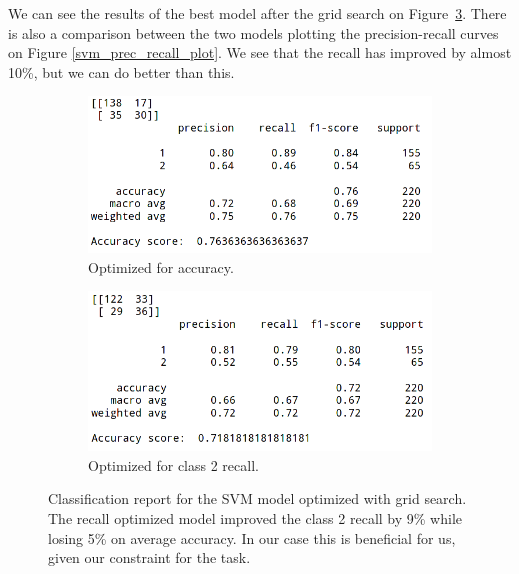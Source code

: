 \documentclass[runningheads]{llncs}
\begin{document}
We can see the results of the best model after the grid search on Figure~\ref{grid_svm}. There is also a comparison between the two models plotting the precision-recall curves on Figure \ref{svm_prec_recall_plot}. We see that the recall has improved by almost 10\%, but we can do better than this.


\begin{figure}
  \centering
  \begin{subfigure}[b]{0.49\textwidth}
    \includegraphics[width=\textwidth]{images/svm_simple.png}
    \caption{Optimized for accuracy.}
    \label{svm_simple}
  \end{subfigure}
  \hfill
  \begin{subfigure}[b]{0.49\textwidth}
    \includegraphics[width=\textwidth]{images/svm_grid.png}
    \caption{Optimized for class 2 recall.}
    \label{grid_svm}
  \end{subfigure}
  \caption{Classification report for the SVM model optimized with grid search. The recall optimized model improved the class 2 recall by 9\% while losing 5\% on average accuracy. In our case this is beneficial for us, given our constraint for the task.}
\end{figure}
\end{document}
